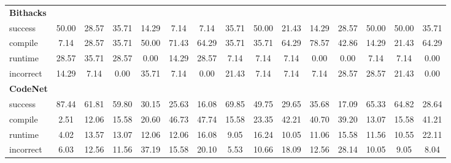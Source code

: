 \begin{table}[t]
\begin{tabular}{@{}lcccccccccccccc@{}}
\textbf{Bithacks} & & & & & & & & & & & & & & \\ 
\quad success & 50.00 & 28.57 & 35.71 & 14.29 & 7.14 & 7.14 & 35.71 & 50.00 & 21.43 & 14.29 & 28.57 & 50.00 & 50.00 & 35.71 \\
\qquad compile & 7.14 & 28.57 & 35.71 & 50.00 & 71.43 & 64.29 & 35.71 & 35.71 & 64.29 & 78.57 & 42.86 & 14.29 & 21.43 & 64.29 \\
\qquad runtime & 28.57 & 35.71 & 28.57 & 0.00 & 14.29 & 28.57 & 7.14 & 7.14 & 7.14 & 0.00 & 0.00 & 7.14 & 7.14 & 0.00 \\
\qquad incorrect & 14.29 & 7.14 & 0.00 & 35.71 & 7.14 & 0.00 & 21.43 & 7.14 & 7.14 & 7.14 & 28.57 & 28.57 & 21.43 & 0.00 \\
 

\textbf{CodeNet} & & & & & & & & & & & & & & \\ 
\quad success & 87.44 & 61.81 & 59.80 & 30.15 & 25.63 & 16.08 & 69.85 & 49.75 & 29.65 & 35.68 & 17.09 & 65.33 & 64.82 & 28.64 \\
\qquad compile & 2.51 & 12.06 & 15.58 & 20.60 & 46.73 & 47.74 & 15.58 & 23.35 & 42.21 & 40.70 & 39.20 & 13.07 & 15.58 & 41.21 \\
\qquad runtime & 4.02 & 13.57 & 13.07 & 12.06 & 12.06 & 16.08 & 9.05 & 16.24 & 10.05 & 11.06 & 15.58 & 11.56 & 10.55 & 22.11 \\
\qquad incorrect & 6.03 & 12.56 & 11.56 & 37.19 & 15.58 & 20.10 & 5.53 & 10.66 & 18.09 & 12.56 & 28.14 & 10.05 & 9.05 & 8.04 \\
 

\bottomrule
\end{tabular}
\end{table}




